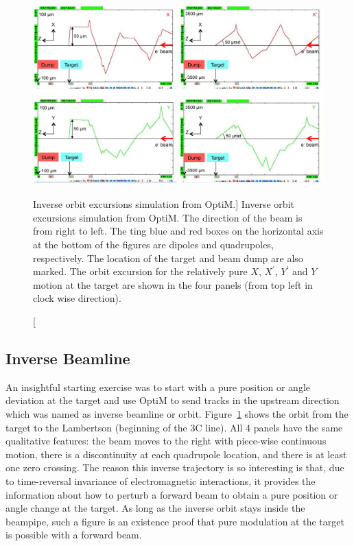 \begin{singlespace}
\begin{figure}[!h]
	\begin{center}
	\includegraphics[width=15.0cm]{figures/BModInverseBeamline}
	\end{center}
	\caption
	[Inverse orbit excursions simulation from OptiM.]
	{Inverse orbit excursions simulation from OptiM. The direction of the beam is from right to left. The ting blue and red boxes on the horizontal axis at the bottom of the figures are dipoles and quadrupoles, respectively. The location of the target and beam dump are also marked. The orbit excursion for the relatively pure $X$, $X^{\prime}$, $Y^{\prime}$ and $Y$ motion at the target are shown in the four panels (from top left in clock wise direction).}
	\label{fig:BModInverseBeamline}
\end{figure}
\end{singlespace}

\subsection{Inverse Beamline}
\label{Inverse Beamline}
An insightful starting exercise was to start with a pure position or angle deviation at the target and use OptiM to send tracks in the upstream direction which was named as inverse beamline or orbit. Figure~\ref{fig:BModInverseBeamline} shows the orbit from the target to the Lambertson (beginning of the 3C line). All 4 panels have the same qualitative features: the beam moves to the right with piece-wise continuous motion, there is a discontinuity at each quadrupole location, and there is at least one zero crossing. The reason this inverse trajectory is so interesting is that, due to time-reversal invariance of electromagnetic interactions, it provides the information about how to perturb a forward beam to obtain a pure position or angle change at the target. As long as the inverse orbit stays inside the beampipe, such a figure is an existence proof that pure modulation at the target is possible with a forward beam. 


